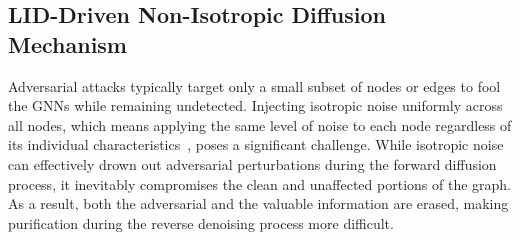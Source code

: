 \subsection{LID-Driven Non-Isotropic Diffusion Mechanism}
\label{method:part2}
Adversarial attacks typically target only a small subset of nodes or edges to fool the GNNs while remaining undetected. 
Injecting isotropic noise uniformly across all nodes, which means applying the same level of noise to each node regardless of its individual characteristics~\cite{voleti2022score}, poses a significant challenge. 
While isotropic noise can effectively drown out adversarial perturbations during the forward diffusion process, it inevitably compromises the clean and unaffected portions of the graph. 
As a result, both the adversarial and the valuable information are erased, making purification during the reverse denoising process more difficult.

